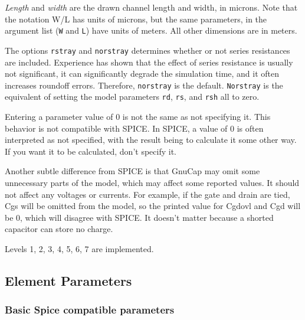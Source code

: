 {\it Length} and {\it width} are the drawn channel length and width, in
microns.  Note that the notation W/L has units of microns, but the same
parameters, in the argument list ({\tt W} and {\tt L}) have units of meters.
All other dimensions are in meters.

The options {\tt rstray} and {\tt norstray} determines whether or not series 
resistances are included.  Experience has shown that the effect of series 
resistance is usually not significant, it can significantly degrade the 
simulation time, and it often increases roundoff errors.  Therefore, 
{\tt norstray} is the default.  {\tt Norstray} is the equivalent of 
setting the model parameters {\tt rd}, {\tt rs}, and {\tt rsh} all to zero.

Entering a parameter value of 0 is not the same as not specifying
it.  This behavior is not compatible with SPICE.  In SPICE, a value
of 0 is often interpreted as not specified, with the result being
to calculate it some other way.  If you want it to be calculated,
don't specify it.

Another subtle difference from SPICE is that GnuCap may omit some
unnecessary parts of the model, which may affect some reported
values.  It should not affect any voltages or currents.  For example,
if the gate and drain are tied, Cgs will be omitted from the model,
so the printed value for Cgdovl and Cgd will be 0, which will
disagree with SPICE.  It doesn't matter because a shorted capacitor
can store no charge.

Levels 1, 2, 3, 4, 5, 6, 7 are implemented.
\subsection{Element Parameters}

\subsubsection{Basic Spice compatible parameters}

